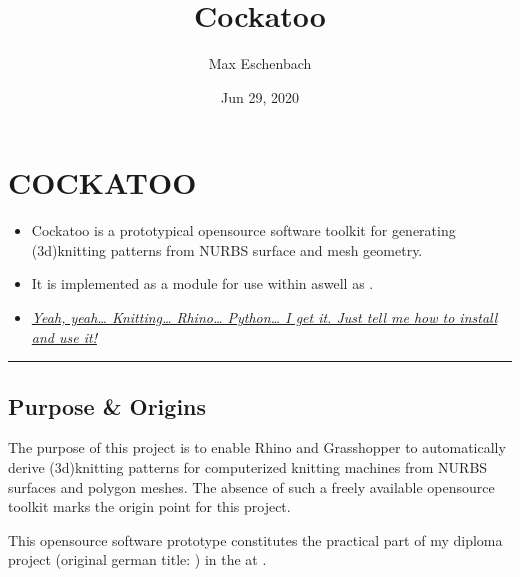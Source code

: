 \documentclass[letterpaper,10pt,english]{sphinxmanual}
\title{Cockatoo}
\date{Jun 29, 2020}
\author{Max Eschenbach}
\begin{document}
\pagestyle{empty}
\sphinxmaketitle
\pagestyle{plain}
\sphinxtableofcontents
\pagestyle{normal}
\label{\detokenize{index::doc}}



\chapter{COCKATOO}
\label{\detokenize{README:cockatoo}}\label{\detokenize{README::doc}}\begin{itemize}
\item {} 
Cockatoo is a prototypical open\sphinxhyphen{}source software toolkit for
generating (3d\sphinxhyphen{})knitting patterns from NURBS surface and mesh
geometry.

\item {} 
It is implemented as a  module
for use within 
aswell as
.

\item {} 
{\hyperref[\detokenize{README:installation}]{\emph{Yeah, yeah… Knitting… Rhino… Python… I get it. Just tell me
how to install and use it!}}}

\end{itemize}


\bigskip\hrule\bigskip



\section{Purpose \& Origins}
\label{\detokenize{README:purpose-origins}}\label{\detokenize{README:id1}}
The purpose of this project is to enable Rhino and Grasshopper to
automatically derive (3d\sphinxhyphen{})knitting patterns for computerized knitting
machines from NURBS surfaces and polygon meshes. The absence of such a
freely available open\sphinxhyphen{}source toolkit marks the origin point for this
project.

This open\sphinxhyphen{}source software prototype constitutes the practical part of my
diploma project  (original german title: ) in the  at .
\end{document}
